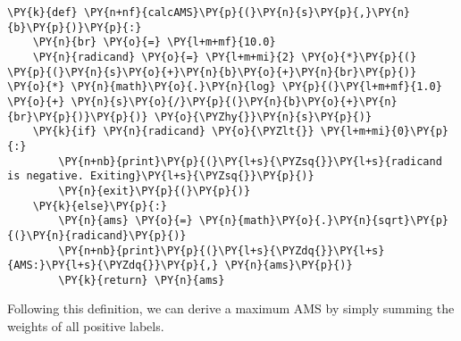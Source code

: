 {\par%
\vspace{-1\baselineskip}%
}%
\begin{notebookcell}[]%
\begin{addmargin}[\cellleftmargin]{0em}%
{\smaller%
\par%
%
\vspace{-1\smallerfontscale}%
\begin{Verbatim}[commandchars=\\\{\}]
\PY{k}{def} \PY{n+nf}{calcAMS}\PY{p}{(}\PY{n}{s}\PY{p}{,}\PY{n}{b}\PY{p}{)}\PY{p}{:}    
    \PY{n}{br} \PY{o}{=} \PY{l+m+mf}{10.0}
    \PY{n}{radicand} \PY{o}{=} \PY{l+m+mi}{2} \PY{o}{*}\PY{p}{(} \PY{p}{(}\PY{n}{s}\PY{o}{+}\PY{n}{b}\PY{o}{+}\PY{n}{br}\PY{p}{)} \PY{o}{*} \PY{n}{math}\PY{o}{.}\PY{n}{log} \PY{p}{(}\PY{l+m+mf}{1.0} \PY{o}{+} \PY{n}{s}\PY{o}{/}\PY{p}{(}\PY{n}{b}\PY{o}{+}\PY{n}{br}\PY{p}{)}\PY{p}{)} \PY{o}{\PYZhy{}}\PY{n}{s}\PY{p}{)}
    \PY{k}{if} \PY{n}{radicand} \PY{o}{\PYZlt{}} \PY{l+m+mi}{0}\PY{p}{:}
        \PY{n+nb}{print}\PY{p}{(}\PY{l+s}{\PYZsq{}}\PY{l+s}{radicand is negative. Exiting}\PY{l+s}{\PYZsq{}}\PY{p}{)}
        \PY{n}{exit}\PY{p}{(}\PY{p}{)}
    \PY{k}{else}\PY{p}{:}
        \PY{n}{ams} \PY{o}{=} \PY{n}{math}\PY{o}{.}\PY{n}{sqrt}\PY{p}{(}\PY{n}{radicand}\PY{p}{)}
        \PY{n+nb}{print}\PY{p}{(}\PY{l+s}{\PYZdq{}}\PY{l+s}{AMS:}\PY{l+s}{\PYZdq{}}\PY{p}{,} \PY{n}{ams}\PY{p}{)}
        \PY{k}{return} \PY{n}{ams}
\end{Verbatim}
%
\par%
\vspace{-1\smallerfontscale}}%
\end{addmargin}
\end{notebookcell}


    Following this definition, we can derive a maximum AMS by simply summing
the weights of all positive labels.


